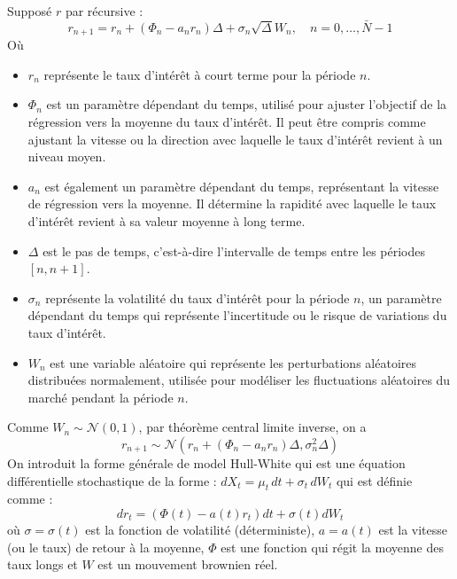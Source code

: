 Supposé $r$ par récursive : 
\begin{equation}
    r_{n+1} = r_n + (\Phi_n - a_n r_n) \Delta + \sigma_n \sqrt{\Delta} W_n, \quad n = 0, \ldots, \bar{N} - 1
\end{equation}
Où 
\begin{itemize}
    \item \( r_n \) représente le taux d'intérêt à court terme pour la période \( n \).
    \item \( \Phi_n \) est un paramètre dépendant du temps, utilisé pour ajuster l'objectif de la régression vers la moyenne du taux d'intérêt. Il peut être compris comme ajustant la vitesse ou la direction avec laquelle le taux d'intérêt revient à un niveau moyen.
    \item \( a_n \) est également un paramètre dépendant du temps, représentant la vitesse de régression vers la moyenne. Il détermine la rapidité avec laquelle le taux d'intérêt revient à sa valeur moyenne à long terme.
    \item \( \Delta \) est le pas de temps, c'est-à-dire l'intervalle de temps entre les périodes \( [n, n+1] \).
    \item \( \sigma_n \) représente la volatilité du taux d'intérêt pour la période \( n \), un paramètre dépendant du temps qui représente l'incertitude ou le risque de variations du taux d'intérêt.
    \item \( W_n \) est une variable aléatoire qui représente les perturbations aléatoires distribuées normalement, utilisée pour modéliser les fluctuations aléatoires du marché pendant la période \( n \).
\end{itemize}

Comme $W_n \sim \mathcal{N}(0,1)$,  par théorème central limite inverse, on a 
\begin{equation}
    r_{n+1} \sim \mathcal{N} \left( {r_n + (  \Phi_n - a_n r_n) \Delta, \sigma^2_n \Delta} \right)
\end{equation}
On introduit la forme générale de model Hull-White qui est une équation différentielle stochastique de la forme : 
$\displaystyle dX_{t}=\mu _{t}\,dt+\sigma _{t}\,dW_{t}$ qui est définie comme : 
\begin{equation*}
    dr_t = (\Phi(t)-a(t)r_t)dt +\sigma (t)dW_t
\end{equation*}
où $\sigma = \sigma (t)$ est la fonction de volatilité (déterministe), $a = a(t)$ est la vitesse (ou le taux) de retour à la moyenne, $\Phi$ est une fonction qui régit la moyenne des taux longs et $W$ est un mouvement brownien réel.

